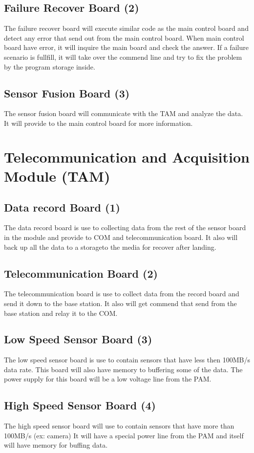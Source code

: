 \documentclass[12pt,article]{memoir}
\begin{document}
\subsection{Failure Recover Board (2)}
The failure recover board will execute similar code as the main control board and detect any error that send out from the main control board. When main control board have error, it will inquire the main board and check the answer. If a failure scenario is fullfill, it will take over the commend line and try to fix the problem by the program storage inside.
\subsection{Sensor Fusion Board (3)}
The sensor fusion board will communicate with the TAM and analyze the data. It will provide to the main control board for more information.
\section{Telecommunication and Acquisition Module (TAM)}
\subsection{Data record Board (1)}
The data record board is use to collecting data from the rest of the sensor board in the module and provide to COM and telecommunication board. It also will back up all the data to a storageto the media for recover after landing.
\subsection{Telecommunication Board (2)}
The telecommunication board is use to collect data from the record board and send it down to the base station. It also will get commend that send from the base station and relay it to the COM.
\subsection{Low Speed Sensor Board (3)}
The low speed sensor board is use to contain sensors that have less then 100MB/s data rate. This board will also have memory to buffering some of the data. The power supply for this board will be a low voltage line from the PAM.
\subsection{High Speed Sensor Board (4)}
The high speed sensor board will use to contain sensors that have more than 100MB/s (ex: camera) It will have a special power line from the PAM and itself will have memory for buffing data.
\end{document}
